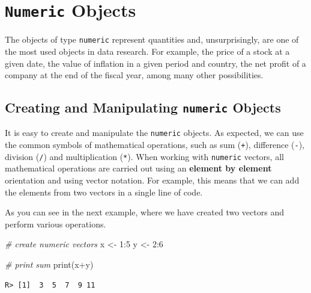 \documentclass[
  12pt,
]{book}
\newenvironment{Shaded}{\begin{snugshade}}{\end{snugshade}}
\newcommand{\CommentTok}[1]{\textcolor[rgb]{0.37,0.37,0.37}{\textit{#1}}}
\newcommand{\DecValTok}[1]{\textcolor[rgb]{0.06,0.06,0.06}{#1}}
\newcommand{\FunctionTok}[1]{\textcolor[rgb]{0,0,0}{#1}}
\newcommand{\NormalTok}[1]{#1}
\newcommand{\OtherTok}[1]{\textcolor[rgb]{0.37,0.37,0.37}{#1}}
\newcommand{\SpecialCharTok}[1]{\textcolor[rgb]{0,0,0}{#1}}
\begin{document}
\hypertarget{numeric-objects}{%
\section{\texorpdfstring{\texttt{Numeric} Objects}{Numeric Objects}}\label{numeric-objects}}

The objects of type \texttt{numeric} represent quantities and, unsurprisingly, are one of the most used objects in data research. For example, the price of a stock at a given date, the value of inflation in a given period and country, the net profit of a company at the end of the fiscal year, among many other possibilities.

\hypertarget{creating-and-manipulating-numeric-objects}{%
\subsection{\texorpdfstring{Creating and Manipulating \texttt{numeric} Objects}{Creating and Manipulating numeric Objects}}\label{creating-and-manipulating-numeric-objects}}

It is easy to create and manipulate the \texttt{numeric} objects. As expected, we can use the common symbols of mathematical operations, such as sum (\texttt{+}), difference (\texttt{-}), division (\texttt{/}) and multiplication (\texttt{*}). When working with \texttt{numeric} vectors, all mathematical operations are carried out using an \textbf{element by element} orientation and using vector notation. For example, this means that we can add the elements from two vectors in a single line of code.

As you can see in the next example, where we have created two vectors and perform various operations.

\begin{Shaded}
\begin{Highlighting}[]
\CommentTok{\# create numeric vectors}
\NormalTok{x }\OtherTok{\textless{}{-}} \DecValTok{1}\SpecialCharTok{:}\DecValTok{5}
\NormalTok{y }\OtherTok{\textless{}{-}} \DecValTok{2}\SpecialCharTok{:}\DecValTok{6}

\CommentTok{\# print sum}
\FunctionTok{print}\NormalTok{(x}\SpecialCharTok{+}\NormalTok{y)}
\end{Highlighting}
\end{Shaded}

\begin{verbatim}
R> [1]  3  5  7  9 11
\end{verbatim}
\end{document}
